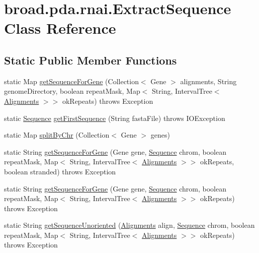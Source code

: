 \hypertarget{classbroad_1_1pda_1_1rnai_1_1_extract_sequence}{\section{broad.\+pda.\+rnai.\+Extract\+Sequence Class Reference}
\label{classbroad_1_1pda_1_1rnai_1_1_extract_sequence}
}
\subsection*{Static Public Member Functions}
\begin{DoxyCompactItemize}
\item 
static Map \hyperlink{classbroad_1_1pda_1_1rnai_1_1_extract_sequence_a59fc486013a478291335961ccf47b5dd}{get\+Sequence\+For\+Gene} (Collection$<$ Gene $>$ alignments, String genome\+Directory, boolean repeat\+Mask, Map$<$ String, Interval\+Tree$<$ \hyperlink{classbroad_1_1pda_1_1datastructures_1_1_alignments}{Alignments} $>$$>$ ok\+Repeats)  throws Exception
\item 
static \hyperlink{classbroad_1_1core_1_1sequence_1_1_sequence}{Sequence} \hyperlink{classbroad_1_1pda_1_1rnai_1_1_extract_sequence_a6adfa50f391f4e203f935ab99b8869b3}{get\+First\+Sequence} (String fasta\+File)  throws I\+O\+Exception 
\item 
static Map \hyperlink{classbroad_1_1pda_1_1rnai_1_1_extract_sequence_a9c14a04f57f62be107bd1c5f9c365f8d}{split\+By\+Chr} (Collection$<$ Gene $>$ genes)
\item 
static String \hyperlink{classbroad_1_1pda_1_1rnai_1_1_extract_sequence_a1c601f128f80203b1f18d782e08c5fd9}{get\+Sequence\+For\+Gene} (Gene gene, \hyperlink{classbroad_1_1core_1_1sequence_1_1_sequence}{Sequence} chrom, boolean repeat\+Mask, Map$<$ String, Interval\+Tree$<$ \hyperlink{classbroad_1_1pda_1_1datastructures_1_1_alignments}{Alignments} $>$$>$ ok\+Repeats, boolean stranded)  throws Exception
\item 
static String \hyperlink{classbroad_1_1pda_1_1rnai_1_1_extract_sequence_ac0527b9f32e6da913fd16225d6d27a5a}{get\+Sequence\+For\+Gene} (Gene gene, \hyperlink{classbroad_1_1core_1_1sequence_1_1_sequence}{Sequence} chrom, boolean repeat\+Mask, Map$<$ String, Interval\+Tree$<$ \hyperlink{classbroad_1_1pda_1_1datastructures_1_1_alignments}{Alignments} $>$$>$ ok\+Repeats)  throws Exception
\item 
static String \hyperlink{classbroad_1_1pda_1_1rnai_1_1_extract_sequence_a28a4bd210bd1c447a44144c25ad2700a}{get\+Sequence\+Unoriented} (\hyperlink{classbroad_1_1pda_1_1datastructures_1_1_alignments}{Alignments} align, \hyperlink{classbroad_1_1core_1_1sequence_1_1_sequence}{Sequence} chrom, boolean repeat\+Mask, Map$<$ String, Interval\+Tree$<$ \hyperlink{classbroad_1_1pda_1_1datastructures_1_1_alignments}{Alignments} $>$$>$ ok\+Repeats)  throws Exception

\end{DoxyCompactItemize}
